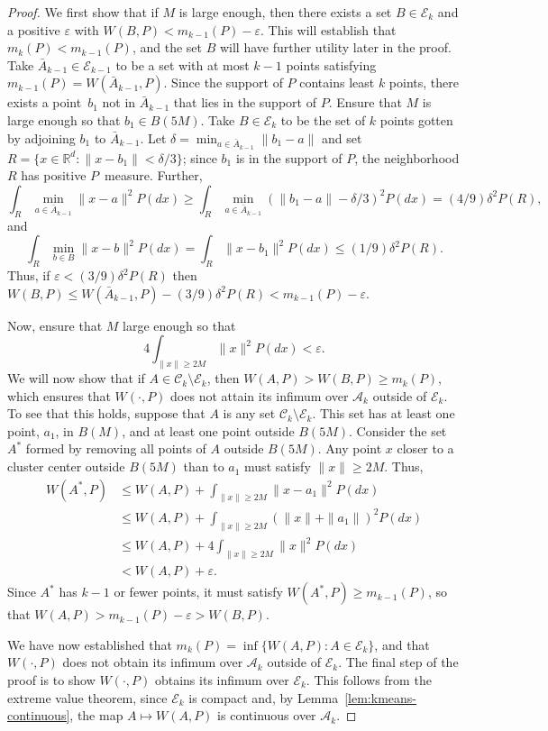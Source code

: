 \documentclass[11pt]{article}
\newcommand{\R}{\mathbb{R}}
\newcommand{\sA}{\mathcal{A}}
\newcommand{\sC}{\mathcal{C}}
\newcommand{\sE}{\mathcal{E}}
\begin{document}
\begin{proof}
We first show that if $M$ is large enough, then there exists a set $B \in
\sE_k$ and a positive $\varepsilon$ with $W(B,P) < m_{k-1}(P) - \varepsilon$.
This will establish that $m_{k}(P) < m_{k-1}(P)$, and the set $B$ will have
further utility later in the proof.  Take $\bar A_{k-1} \in \sE_{k-1}$ to be a
set with at most $k-1$ points satisfying $m_{k-1}(P) = W(\bar A_{k-1},P)$.
Since the support of $P$ contains least $k$ points, there exists a point~$b_1$
not in $\bar A_{k-1}$ that lies in the support of $P$.  Ensure that $M$ is
large enough so that $b_1 \in B(5M)$.  Take $B \in \sE_k$ to be the set of $k$
points gotten by adjoining $b_1$ to $\bar A_{k-1}$.  Let
\(
  \delta = \min_{a \in \bar A_{k-1}} \| b_1 - a \|
\)
and set $R = \{ x \in \R^d : \|x - b_1\| < \delta/3 \}$; since $b_1$
is in the support of $P$, the neighborhood $R$ has positive $P$~measure.
Further,
\[
  \int_{R} \min_{a \in \bar A_{k-1}} \|x - a\|^2 P(dx)
    \geq
      \int_{R} \min_{a \in \bar A_{k-1}} (\|b_1 - a\| - \delta/3)^2 P(dx)
    =
      (4/9) \delta^2 P(R),
\]
and
\[
  \int_{R} \min_{b \in B} \|x - b\|^2 P(dx)
    =
      \int_{R} \|x - b_1\|^2 P(dx)
    \leq
      (1/9) \delta^2 P(R).
\]
Thus, if
\(
  \varepsilon < (3/9) \delta^2 P(R)
\)
then
\(
  W(B,P)
    \leq
      W(\bar A_{k-1},P) - (3/9) \delta^2 P(R)
    <
      m_{k-1}(P) - \varepsilon.
\)


Now, ensure that $M$ large enough so that
\[
  4 \int_{\|x\| \geq 2M} \|x\|^2 P(dx) < \varepsilon.
\]
We will now show that if $A \in \sC_k \setminus \sE_k$, then $W(A,P) > W(B,P)
\geq m_{k}(P)$, which ensures that $W(\cdot, P)$ does not attain its infimum
over $\sA_k$ outside of $\sE_k$.  To see that this holds, suppose that $A$ is
any set $\sC_k \setminus \sE_k$.  This set has at least one point, $a_1$, in
$B(M)$, and at least one point outside $B(5M)$.  Consider the set $A^\ast$
formed by removing all points of $A$ outside $B(5M)$.  Any point $x$ closer to
a cluster center outside $B(5M)$ than to $a_1$ must satisfy $\|x\| \geq 2M$.
Thus,
\begin{align*}
  W(A^\ast, P)
    &\leq W(A,P) + \int_{\|x\| \geq 2M} \|x - a_1\|^2 P(dx) \\
    &\leq W(A,P) + \int_{\|x\| \geq 2M} (\|x\| + \|a_1\|)^2 P(dx) \\
    &\leq W(A,P) + 4 \int_{\|x\| \geq 2M} \|x\|^2 P(dx) \\
    &< W(A,P) + \varepsilon.
\end{align*}
Since $A^\ast$ has $k-1$ or fewer points, it must satisfy $W(A^\ast, P) \geq
m_{k-1}(P)$, so that $W(A, P) > m_{k-1}(P) - \varepsilon > W(B, P)$.


We have now established that $m_k(P) = \inf \{ W(A,P) : A \in \sE_k \}$, and
that $W(\cdot, P)$ does not obtain its infimum over $\sA_k$ outside of
$\sE_k$.  The final step of the proof is to show $W(\cdot, P)$ obtains its
infimum over $\sE_k$.  This follows from the extreme value theorem, since
$\sE_k$ is compact and, by Lemma~\ref{lem:kmeans-continuous}, the map $A
\mapsto W(A,P)$ is continuous over $\sA_k$.
\end{proof}
\end{document}
